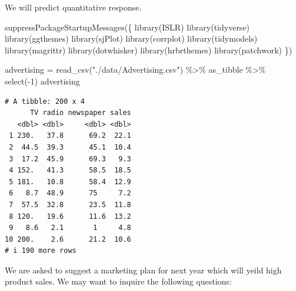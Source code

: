 \documentclass[
  letterpaper,
  DIV=11,
  numbers=noendperiod]{scrreprt}
\newenvironment{Shaded}{\begin{snugshade}}{\end{snugshade}}
\newcommand{\DecValTok}[1]{\textcolor[rgb]{0.47,0.16,0.63}{#1}}
\newcommand{\FunctionTok}[1]{\textcolor[rgb]{0.02,0.16,0.49}{#1}}
\newcommand{\NormalTok}[1]{\textcolor[rgb]{0.33,0.33,0.33}{#1}}
\newcommand{\OtherTok}[1]{\textcolor[rgb]{0.85,0.12,0.09}{#1}}
\newcommand{\SpecialCharTok}[1]{\textcolor[rgb]{0.00,0.46,0.62}{#1}}
\newcommand{\StringTok}[1]{\textcolor[rgb]{0.00,0.50,0.00}{#1}}
\begin{document}
We will predict quantitative response.

\begin{Shaded}
\begin{Highlighting}[]
\FunctionTok{suppressPackageStartupMessages}\NormalTok{(\{}
\FunctionTok{library}\NormalTok{(ISLR)}
\FunctionTok{library}\NormalTok{(tidyverse)}
\FunctionTok{library}\NormalTok{(ggthemes)}
\FunctionTok{library}\NormalTok{(sjPlot)}
\FunctionTok{library}\NormalTok{(corrplot)}
\FunctionTok{library}\NormalTok{(tidymodels)}
\FunctionTok{library}\NormalTok{(magrittr)}
\FunctionTok{library}\NormalTok{(dotwhisker)}
\FunctionTok{library}\NormalTok{(hrbrthemes)}
\FunctionTok{library}\NormalTok{(patchwork)}
\NormalTok{\})}
\end{Highlighting}
\end{Shaded}

\begin{Shaded}
\begin{Highlighting}[]
\NormalTok{advertising }\OtherTok{=} \FunctionTok{read\_csv}\NormalTok{(}\StringTok{"./data/Advertising.csv"}\NormalTok{) }\SpecialCharTok{\%\textgreater{}\%}\NormalTok{ as\_tibble }\SpecialCharTok{\%\textgreater{}\%} \FunctionTok{select}\NormalTok{(}\SpecialCharTok{{-}}\DecValTok{1}\NormalTok{)}
\NormalTok{advertising}
\end{Highlighting}
\end{Shaded}

\begin{verbatim}
# A tibble: 200 x 4
      TV radio newspaper sales
   <dbl> <dbl>     <dbl> <dbl>
 1 230.   37.8      69.2  22.1
 2  44.5  39.3      45.1  10.4
 3  17.2  45.9      69.3   9.3
 4 152.   41.3      58.5  18.5
 5 181.   10.8      58.4  12.9
 6   8.7  48.9      75     7.2
 7  57.5  32.8      23.5  11.8
 8 120.   19.6      11.6  13.2
 9   8.6   2.1       1     4.8
10 200.    2.6      21.2  10.6
# i 190 more rows
\end{verbatim}

We are asked to suggest a marketing plan for next year which will yeild
high product sales. We may want to inquire the following questions:
\end{document}
